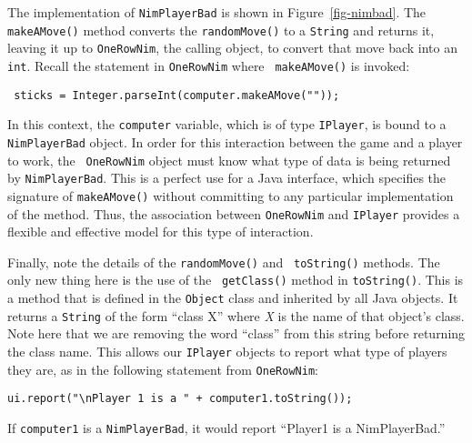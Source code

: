 The implementation of {\tt NimPlayerBad} is shown in
Figure~\ref{fig-nimbad}. The {\tt makeAMove()} method converts the
{\tt randomMove()} to a {\tt String} and returns it, leaving it up to
{\tt OneRowNim}, the calling object, to convert that move back into an
{\tt int}.  Recall the statement in {\tt OneRowNim} where {\tt
makeAMove()} is invoked:

\begin{jjjlisting}
\begin{lstlisting}
 sticks = Integer.parseInt(computer.makeAMove(""));
\end{lstlisting}
\end{jjjlisting}

\noindent In this context, the {\tt computer} variable, which is of
type {\tt IPlayer}, is bound to a {\tt NimPlayerBad} object.  In order
for this interaction between the game and a player to work, the {\tt
OneRowNim} object must know what type of data is being returned by
{\tt NimPlayerBad}.  This is a perfect use for a Java interface, which
specifies the signature of {\tt makeAMove()} without committing to any
particular implementation of the method.  Thus, the association between
{\tt OneRowNim} and {\tt IPlayer} provides a flexible and effective model
for this type of interaction.


Finally, note the details of the {\tt randomMove()} and {\tt
toString()} methods.  The only new thing here is the use of the {\tt
getClass()} method in {\tt toString()}.  This is a method that is
defined in the {\tt Object} class and inherited by all Java
objects. It returns a {\tt String} of the form ``class X'' where {\em
X} is the name of that object's class. Note here that we are removing
the word ``class'' from this string before returning the class name.
This allows our {\tt IPlayer} objects to report what type of players
they are, as in the following statement from {\tt OneRowNim}:

\begin{jjjlisting}
\begin{lstlisting}
ui.report("\nPlayer 1 is a " + computer1.toString());
\end{lstlisting}
\end{jjjlisting}

\noindent If {\tt computer1} is a {\tt NimPlayerBad}, it would
report ``Player1 is a NimPlayerBad.''

